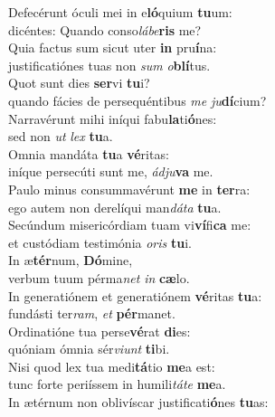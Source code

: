 \evenverse Defecérunt óculi mei in e\textbf{ló}quium \textbf{tu}um:~\*\\
\evenverse dicéntes: Quando conso\textit{lá}\textit{be}\textbf{ris} me?\\
\oddverse Quia factus sum sicut uter \textbf{in} pru\textbf{í}na:~\*\\
\oddverse justificatiónes tuas non \textit{sum} \textit{o}\textbf{blí}tus.\\
\evenverse Quot sunt dies \textbf{ser}vi \textbf{tu}i?~\*\\
\evenverse quando fácies de persequéntibus \textit{me} \textit{ju}\textbf{dí}cium?\\
\oddverse Narravérunt mihi iníqui fabu\textbf{la}ti\textbf{ó}nes:~\*\\
\oddverse sed non \textit{ut} \textit{lex} \textbf{tu}a.\\
\evenverse Omnia mandáta \textbf{tu}a \textbf{vé}ritas:~\*\\
\evenverse iníque persecúti sunt me, \textit{ád}\textit{ju}\textbf{va} me.\\
\oddverse Paulo minus consummavérunt \textbf{me} in \textbf{ter}ra:~\*\\
\oddverse ego autem non derelíqui man\textit{dá}\textit{ta} \textbf{tu}a.\\
\evenverse Secúndum misericórdiam tuam vi\textbf{ví}fi\textbf{ca} me:~\*\\
\evenverse et custódiam testimónia \textit{o}\textit{ris} \textbf{tu}i.\\
\oddverse In æ\textbf{tér}num, \textbf{Dó}mine,~\*\\
\oddverse verbum tuum pérma\textit{net} \textit{in} \textbf{cæ}lo.\\
\evenverse In generatiónem et generatiónem \textbf{vé}ritas \textbf{tu}a:~\*\\
\evenverse fundásti ter\textit{ram}, \textit{et} \textbf{pér}manet.\\
\oddverse Ordinatióne tua perse\textbf{vé}rat \textbf{di}es:~\*\\
\oddverse quóniam ómnia sér\textit{vi}\textit{unt} \textbf{ti}bi.\\
\evenverse Nisi quod lex tua medi\textbf{tá}tio \textbf{me}a est:~\*\\
\evenverse tunc forte periíssem in humili\textit{tá}\textit{te} \textbf{me}a.\\
\oddverse In ætérnum non oblivíscar justificati\textbf{ó}nes \textbf{tu}as:~\*\\
